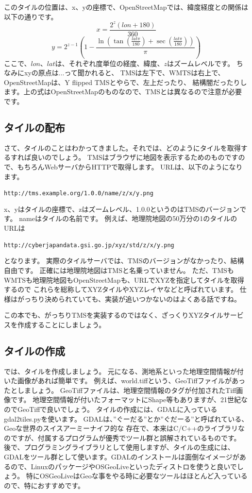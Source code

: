 このタイルの位置は、x、yの座標で、OpenStreetMapでは、緯度経度との関係は以下の通りです。
\[
x = \frac{2^z(lon+180)}{360}
\]
\[
y = 2^{z-1}(1-\frac{\ln(\tan(\frac{lat\pi}{180})+\sec(\frac{lat\pi}{180}))}{\pi})
\]
ここで、$lon$、$lat$は、それぞれ度単位の経度、緯度、$z$はズームレベルです。
ちなみにxyの原点は...って聞かれると、
TMSは左下で、WMTSは右上で、OpenStreetMapは、Y flipped TMSとやらで、左上だったり、
結構闇だったりします。上の式はOpenStreetMapのものなので、TMSとは異なるので注意が必要です。

\subsection*{タイルの配布}
さて、タイルのことはわかってきました。それでは、どのようにタイルを取得するすれば良いのでしょう。
TMSはブラウザに地図を表示するためのものですので、もちろんWebサーバからHTTPで取得します。
URLは、以下のようになります。
\begin{center}
  \texttt{http://tms.example.org/1.0.0/name/z/x/y.png}
\end{center}

x、yはタイルの座標で、zはズームレベル、1.0.0というのはTMSのバージョンです。
nameはタイルの名前です。
例えば、地理院地図の50万分の1のタイルのURLは
\begin{center}
  \texttt{http://cyberjapandata.gsi.go.jp/xyz/std/z/x/y.png}
\end{center}
となります。
実際のタイルサーバでは、TMSのバージョンがなかったり、結構自由です。
正確には地理院地図はTMSと名乗っていません。
ただ、TMSもWMTSも地理院地図もOpenStreetMapも、URLでXYZを指定してタイルを取得するので
これらを総称してXYZタイルやXYZレイヤなどと呼ばれています。
仕様はがっちり決められていても、実装が追いつかないのはよくある話ですね。

この本でも、がっちりTMSを実装するのではなく、ざっくりXYZタイルサービスを作成することにしましょう。

\subsection*{タイルの作成}
では、タイルを作成しましょう。
元になる、測地系といった地理空間情報が付いた画像があれば簡単です。
例えば、world.tiffという、GeoTiffファイルがあったとしましょう。
GeoTiffファイルは、地理空間情報のタグが付加されたTiff画像です。
地理空間情報が付いたフォーマットにShape等もありますが、21世紀なのでGeoTiffで良いでしょう。
タイルの作成には、GDALに入っているgdal2tiles.pyを使います。
GDALは、''ぐーだる''とか''ぐだーる''と呼ばれている、Geoな世界のスイスアーミーナイフ的な
存在で、本来はC/C++のライブラリなのですが、付属するプログラムが優秀でツール群と誤解されているものです。
後で、プログラミングライブラリとして使用しますが、タイルの生成には、GDALをツール群として使います。GDALのインストールは面倒なイメージがあるので、LinuxのパッケージやOSGeoLiveといったディストロを使うと良いでしょう。
特にOSGeoLiveはGeoな事をやる時に必要なツールはほとんど入っているので、特におすすめです。

